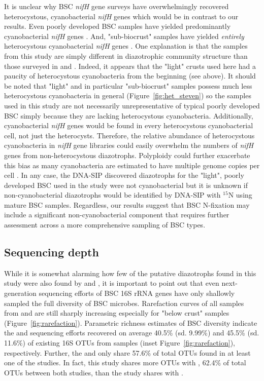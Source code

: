 It is unclear why BSC \textit{nifH} gene surveys have overwhelmingly recovered
heterocystous, cyanobacterial \textit{nifH} genes which would be in contrast to
our results. Even poorly developed BSC samples have yielded predominantly
cyanobacterial \textit{nifH} genes \citep{14766579}. And, "sub-biocrust"
samples have yielded \textit{entirely} heterocystous cyanobacterial
\textit{nifH} genes \citep{Yeager_2012}. One explanation is that the samples
from this study are simply different in diazotrophic community structure than
those surveyed in \citet{Yeager} \citet{14766579} and \citet{Yeager_2012}.
Indeed, it appears that the "light" crusts used here had a paucity of
heterocystous cyanobacteria from the beginning (see above). It should be noted
that "light" and in particular "sub-biocrust" samples possess much less
heterocystous cyanobacteria in general (Figure~\ref{fig:het_steven}) so the
samples used in this study are not necessarily unrepresentative of typical
poorly developed BSC simply because they are lacking heterocystous
cyanobacteria. Additionally, cyanobacterial \textit{nifH} genes would be found
in every heterocystous cyanobacterial cell, not just the
heterocysts. Therefore, the relative abundance of heterocystous cyanobacteria
in \textit{nifH} gene libraries could easily overwhelm the numbers of
\textit{nifH} genes from non-heterocystous diazotrophs. Polyploidy could
further exacerbate this bias as many cyanobacteria are estimated to have
multiple genome copies per cell \citep{Griese_2011}. In any case, the DNA-SIP
discovered diazotrophs for the "light", poorly developed BSC used in the study
were not cyanobacterial but it is unknown if non-cyanobacterial diazotrophs
would be identified by DNA-SIP with $^{15}$N using mature BSC samples.
Regardless, our results suggest that BSC N-fixation may include a significant
non-cyanobacterial component that requires further assessment across a more
comprehensive sampling of BSC types.

\subsection{Sequencing depth}
While it is somewhat alarming how few of the putative diazotrophs found in this
study were also found by \citet{Garcia_Pichel_2013} and \citet{Steven_2013}, it
is important to point out that even next-generation sequencing efforts of BSC
16S rRNA genes have only shallowly sampled the full diversity of BSC microbes.
Rarefaction curves of all samples from \citet{Steven_2013} and
\citet{Garcia_Pichel_2013} are still sharply increasing especially for "below
crust" samples (Figure~\ref{fig:rarefaction}). Parametric richness estimates of
BSC diversity indicate the \citet{Steven_2013} and \citet{Garcia_Pichel_2013}
sequencing efforts recovered on average 40.5\% (sd. 9.99\%) and 45.5\% (sd.
11.6\%) of existing 16S OTUs from samples (inset Figure~\ref{fig:rarefaction}),
respectively. Further, the \citet{Steven_2013} and \citet{Garcia_Pichel_2013}
only share 57.6\% of total OTUs found in at least one of the studies. In fact,
this study shares more OTUs with \citet{Steven_2013}, 62.4\% of total OTUs
between both studies, than the \citet{Steven_2013} study shares with
\citet{Garcia_Pichel_2013}. 

